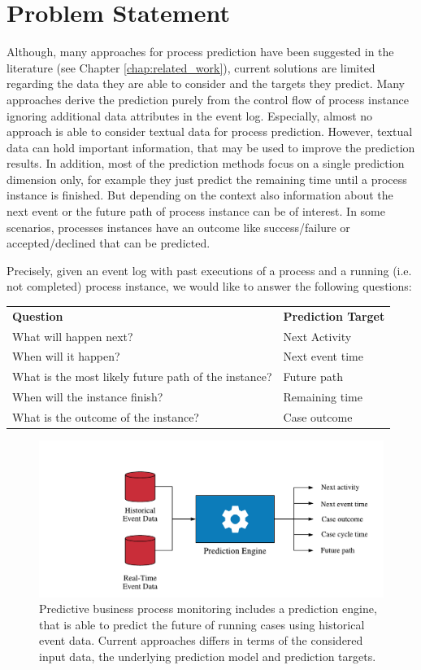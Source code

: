 \section{Problem Statement}

Although, many approaches for process prediction have been suggested in the literature (see Chapter \ref{chap:related_work}), current solutions are limited regarding the data they are able to consider and the targets they predict.
Many approaches derive the prediction purely from the control flow of process instance ignoring additional data attributes in the event log.
Especially, almost no approach is able to consider textual data for process prediction.
However, textual data can hold important information, that may be used to improve the prediction results.
In addition, most of the prediction methods focus on a single prediction dimension only, for example they just predict the remaining time until a process instance is finished.
But depending on the context also information about the next event or the future path of process instance can be of interest.
In some scenarios, processes instances have an outcome like success/failure or accepted/declined that can be predicted.

Precisely, given an event log with past executions of a process and a running (i.e. not completed) process instance, we would like to answer the following questions:

\begin{tabular}{ll}
	\textbf{Question} & \textbf{Prediction Target} \\
	What will happen next? & Next Activity\\
	When will it happen? & Next event time\\
	What is the most likely future path of the instance? & Future path\\
	When will the instance finish? & Remaining time\\
	What is the outcome of the instance? & Case outcome
\end{tabular}

\begin{figure}[htbp!]
	\centering
	\includegraphics[width=\textwidth]{figures/problem-description}
	\caption[hello]{Predictive business process monitoring includes a prediction engine, that is able to predict the future of running cases using historical event data. Current approaches differs in terms of the considered input data, the underlying prediction model and prediction targets.}
	\label{fig:/problem-description}
\end{figure}

